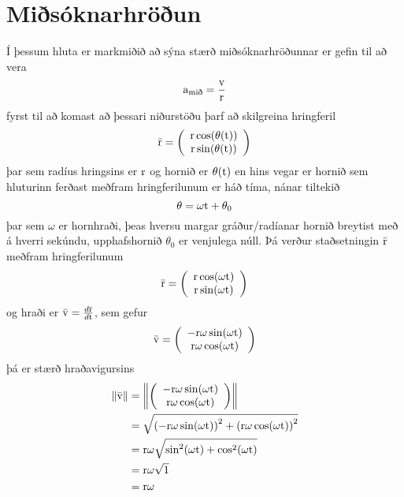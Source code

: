 \section{Miðsóknarhröðun}
Í þessum hluta er markmiðið að sýna stærð miðsóknarhröðunnar er gefin til að vera
\begin{equation}
	\textrm{a}_\text{mið} = \frac{\textrm{v}}{\textrm{r}}
\end{equation}
fyrst til að komast að þessari niðurstöðu þarf að skilgreina hringferil
\begin{align*}
	\bar {\textrm{r}} = 
		\left( 
			\begin{array}{c}
				\textrm{r} \cos( \theta(\textrm{t}) )\\
				\textrm{r} \sin( \theta(\textrm{t}) )\\
			\end{array}
		\right)
\end{align*}
þar sem radíus hringsins er $\textrm{r}$ og hornið er $\theta(\textrm{t})$
en hins vegar er hornið sem hluturinn ferðast meðfram hringferilunum er háð
tíma, nánar tiltekið
\[
	\theta = \omega \textrm{t} + \theta_0
\]
þar sem $\omega$ er hornhraði, þeas hversu margar gráður/radíanar hornið breytist
með á hverri sekúndu, upphafshornið $\theta_0$ er venjulega núll. 
Þá verður staðsetningin $\bar {\textrm{r}}$ meðfram hringferilunum
\begin{align*}
	\bar {\textrm{r}} = 
		\left( 
			\begin{array}{c}
				\textrm{r} \cos( \omega \textrm{t} )\\
				\textrm{r} \sin( \omega \textrm{t})\\
			\end{array}
		\right)
\end{align*}
og hraði er $\bar {\textrm{v}} = \frac{d \bar {\textrm{r}}}{ d \textrm{t}}$, sem gefur
\begin{align*}
	\bar {\textrm{v}} = 
		\left( 
			\begin{array}{c}
				- \textrm{r} \omega \sin( \omega \textrm{t} )\\
				\textrm{r} \omega \cos( \omega \textrm{t})\\
			\end{array}
		\right)
\end{align*}
þá er stærð hraðavigursins
\begin{align*}
	\left\| \bar {\textrm{v}} \right\| &= 
		\left\| \left( 
			\begin{array}{c}
				- \textrm{r} \omega \sin( \omega \textrm{t} )\\
				\textrm{r} \omega \cos( \omega \textrm{t})\\
			\end{array}
		\right)
		\right\| \\
	 &= 
		\sqrt{ \left( - \textrm{r} \omega \sin( \omega \textrm{t} ) \right)^2 
			+ \left( \textrm{r} \omega \cos( \omega \textrm{t}) \right)^2 }
		\\
		&= \textrm{r} \omega 
			\sqrt{ \sin^2( \omega \textrm{t} ) +  \cos^2( \omega \textrm{t} ) } \\
		&= \textrm{r} \omega 
			\sqrt{ 1 } \\
		&= \textrm{r} \omega
\end{align*}
